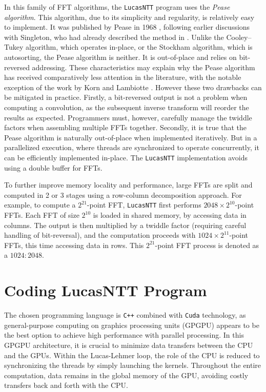 \documentclass{article}
\begin{document}
In this family of FFT algorithms, the \texttt{LucasNTT} program uses the \textit{Pease algorithm}. This algorithm, due to its simplicity and regularity, is relatively easy to implement. It was published by Pease in 1968 \cite{Pea68}, following earlier discussions with Singleton, who had already described the method in \cite{Sin67a}. Unlike the Cooley–Tukey algorithm, which operates in-place, or the Stockham algorithm, which is autosorting, the Pease algorithm is neither. It is out-of-place and relies on bit-reversed addressing. These characteristics may explain why the Pease algorithm has received comparatively less attention in the literature, with the notable exception of the work by Korn and Lambiotte \cite{KL79}. However these two drawbacks can be mitigated in practice. Firstly, a bit-reversed output is not a problem when computing a convolution, as the subsequent inverse transform will reorder the results as expected. Programmers must, however, carefully manage the twiddle factors when assembling multiple FFTs together. Secondly, it is true that the Pease algorithm is naturally out-of-place when implemented iteratively. But in a parallelized execution, where threads are synchronized to operate concurrently, it can be efficiently implemented in-place. The \texttt{LucasNTT} implementation avoids using a double buffer for FFTs.

To further improve memory locality and performance, large FFTs are split and computed in 2 or 3 stages using a row-column decomposition approach. For example, to compute a $2^{21}$-point FFT, \texttt{LucasNTT} first performs $2048 \times 2^{10}$-point FFTs. Each FFT of size $2^{10}$ is loaded in shared memory, by accessing data in columns. The output is then multiplied by a twiddle factor (requiring careful handling of bit-reversal), and the computation proceeds with $1024 \times 2^{11}$-point FFTs, this time accessing data in rows. This $2^{21}$-point FFT process is denoted as a \texttt{$1024:2048$}.

\section{Coding LucasNTT Program}

The chosen programming language is \texttt{C++} combined with \texttt{Cuda} technology, as general-purpose computing on graphics processing units (GPGPU) appears to be the best option to achieve high performance with parallel processing. In this GPGPU architecture, it is crucial to minimize data transfers between the CPU and the GPUs. Within the Lucas-Lehmer loop, the role of the CPU is reduced to synchronizing the threads by simply launching the kernels. Throughout the entire computation, data remains in the global memory of the GPU, avoiding costly transfers back and forth with the CPU.
\end{document}
